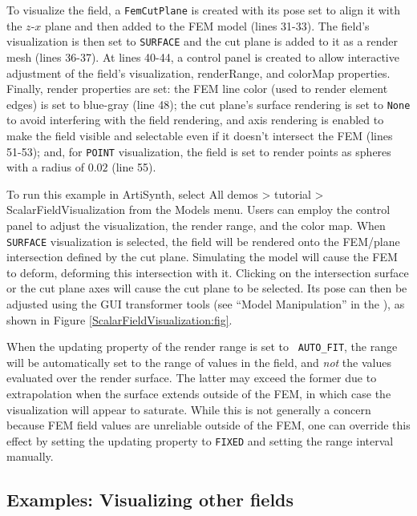 To visualize the field, a {\tt FemCutPlane} is created with its pose
set to align it with the $z$-$x$ plane and then added to the FEM model
(lines 31-33). The field's visualization is then set to {\tt SURFACE}
and the cut plane is added to it as a render mesh (lines 36-37).  At
lines 40-44, a control panel is created to allow interactive
adjustment of the field's {\sf visualization}, {\sf renderRange}, and
{\sf colorMap} properties. Finally, render properties are set: the FEM
line color (used to render element edges) is set to blue-gray (line
48); the cut plane's surface rendering is set to {\tt None} to avoid
interfering with the field rendering, and axis rendering is enabled to
make the field visible and selectable even if it doesn't intersect the
FEM (lines 51-53); and, for {\tt POINT} visualization, the field is
set to render points as spheres with a radius of $0.02$ (line 55).

To run this example in ArtiSynth, select {\sf All demos > tutorial >
ScalarFieldVisualization} from the {\sf Models} menu. Users can employ
the control panel to adjust the visualization, the render range, and
the color map. When {\tt SURFACE} visualization is selected, the field
will be rendered onto the FEM/plane intersection defined by the cut
plane. Simulating the model will cause the FEM to deform, deforming
this intersection with it. Clicking on the intersection surface or the
cut plane axes will cause the cut plane to be selected. Its pose can
then be adjusted using the GUI transformer tools (see ``Model
Manipulation'' in the ), as shown in
Figure \ref{ScalarFieldVisualization:fig}.

\begin{sideblock}
When the {\sf updating} property of the render range is set to {\tt
AUTO\_FIT}, the range will be automatically set to the range of values
in the field, and {\it not} the values evaluated over the render
surface. The latter may exceed the former due to extrapolation when
the surface extends outside of the FEM, in which case the
visualization will appear to saturate. While this is not generally a
concern because FEM field values are unreliable outside of the FEM,
one can override this effect by setting the {\sf updating} property to
{\tt FIXED} and setting the range interval manually.
\end{sideblock}

\subsection{Examples: Visualizing other fields}
\label{OtherFieldVisualization:sec}

